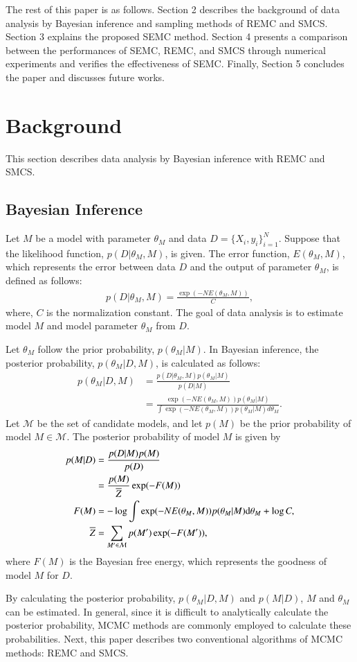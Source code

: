 \documentclass[12pt]{article}
\begin{document}
The rest of this paper is as follows.
Section 2 describes the background of data analysis by Bayesian inference and sampling methods of REMC and SMCS.
Section 3 explains the proposed SEMC method.
Section 4 presents a comparison between the performances of SEMC, REMC, and SMCS through numerical experiments and verifies the effectiveness of SEMC.
Finally, Section 5 concludes the paper and discusses future works.

\section{Background}
This section describes data analysis by Bayesian inference with REMC and SMCS.

\subsection{Bayesian Inference}
Let $M$ be a model with parameter $\theta_M$ and data $D = \{X_i, y_i\}_{i=1}^N$.
Suppose that the likelihood function, $p(D|\theta_M, M)$, is given.
The error function, $E(\theta_M, M)$, which represents the error between data $D$ and the output of parameter $\theta_M$, is defined as follows:
\begin{align}
  \label{eq:likelihood}
  p(D|\theta_M, M) = \frac{\exp(-NE(\theta_M, M))}{C},
\end{align}
where, $C$ is the normalization constant.
The goal of data analysis is to estimate model $M$ and model parameter $\theta_M$ from $D$. \par

Let $\theta_M$ follow the prior probability, $p(\theta_M|M)$.
In Bayesian inference, the posterior probability, $p(\theta_M|D, M)$, is calculated as follows:
\begin{align}
  \label{eq:posterior}
  p(\theta_M|D, M) &= \frac{p(D|\theta_M, M)p(\theta_M|M)}{p(D|M)} \\
  &= \frac{\exp(-NE(\theta_M, M))p(\theta_M|M)}{\int \exp(-NE(\theta_M, M))p(\theta_M|M)d\theta_M}.
\end{align}
Let $\mathcal{M}$ be the set of candidate models, and let $p(M)$ be the prior probability of model $M \in \mathcal{M}$.
The posterior probability of model $M$ is given by
\begin{align}
  \label{eq:model_posterior}
  p(M|D) &= \frac{p(D|M)p(M)}{p(D)} \\
         &= \frac{p(M)}{\overline{Z}} \exp(-F(M)) \\
  F(M) &= -\log\int \exp(-NE(\theta_M, M))p(\theta_M|M)\textup{d}\theta_M + \log C, \\
  \overline{Z} &= \sum_{M' \in \mathcal{M}} p(M')\exp(-F(M')),
\end{align}
where $F(M)$ is the Bayesian free energy, which represents the goodness of model $M$ for $D$. \par
By calculating the posterior probability, $p(\theta_M|D, M)$ and $p(M|D)$,  $M$ and $\theta_M$ can be estimated.
In general, since it is difficult to analytically calculate the posterior probability, MCMC methods are commonly employed to calculate these probabilities.
Next, this paper describes two conventional algorithms of MCMC methods: REMC and SMCS.
\end{document}
